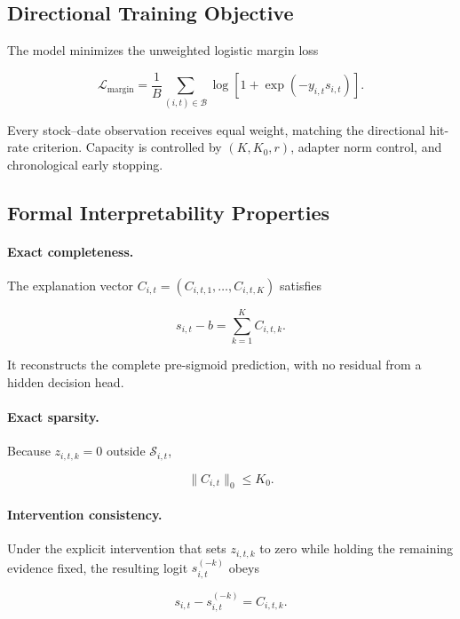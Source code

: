 \documentclass[11pt]{article}
\begin{document}
\subsection{Directional Training Objective}

The model minimizes the unweighted logistic margin loss

\begin{equation}
\mathcal L_{\mathrm{margin}}
=
\frac{1}{B}
\sum_{(i,t)\in\mathcal B}
\log
\left[
1+
\exp
\left(
-y_{i,t}s_{i,t}
\right)
\right].
\end{equation}

Every stock--date observation receives equal weight, matching the directional
hit-rate criterion. Capacity is controlled by $(K,K_0,r)$, adapter norm
control, and chronological early stopping.

\subsection{Formal Interpretability Properties}

\paragraph{Exact completeness.}
The explanation vector
$C_{i,t}=(C_{i,t,1},\ldots,C_{i,t,K})$ satisfies

\begin{equation}
s_{i,t}-b
=
\sum_{k=1}^{K}C_{i,t,k}.
\end{equation}

It reconstructs the complete pre-sigmoid prediction, with no residual from a
hidden decision head.

\paragraph{Exact sparsity.}
Because $z_{i,t,k}=0$ outside $\mathcal S_{i,t}$,

\begin{equation}
\|C_{i,t}\|_0
\leq
K_0.
\end{equation}

\paragraph{Intervention consistency.}
Under the explicit intervention that sets $z_{i,t,k}$ to zero while holding
the remaining evidence fixed, the resulting logit $s_{i,t}^{(-k)}$ obeys

\begin{equation}
s_{i,t}
-
s_{i,t}^{(-k)}
=
C_{i,t,k}.
\end{equation}
\end{document}
